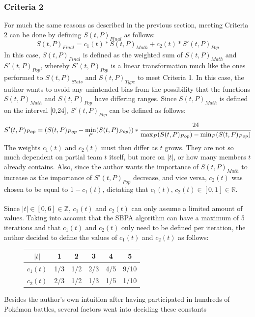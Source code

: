\documentclass{article}
\begin{document}
\subsubsection{Criteria 2}
For much the same reasons as described in the previous section, meeting Criteria 2 can be done by defining $S(t,P)_{Final}$ as follows:
\begin{equation*}
	S(t,P)_{Final}=c_1(t)*S(t,P)_{Math}+c_2(t)*S'(t,P)_{Pop}
\end{equation*}
In this case, $S(t,P)_{Final}$ is defined as the weighted sum of $S(t,P)_{Math}$ and $S'(t,P)_{Pop}$, whereby $S'(t,P)_{Pop}$ is a linear transformation much like the ones performed to $S(t,P)_{Stats}$ and $S(t,P)_{Type}$ to meet Criteria 1. In this case, the author wants to avoid any unintended bias from the possibility that the functions $S(t,P)_{Math}$ and $S(t,P)_{Pop}$ have differing ranges. Since $S(t,P)_{Math}$ is defined on the interval [0,24], $S'(t,P)_{Pop}$ can be defined as follows:
\begin{equation*}
	S'(t,P)_{Pop}=(S(t,P)_{Pop}-\min_P(S(t,P)_{Pop}))*\cfrac{24}{\max_P(S(t,P)_{Pop})-\min_P(S(t,P)_{Pop})}
\end{equation*}
The weights $c_1(t)$ and $c_2(t)$ must then differ as $t$ grows. They are not so much dependent on partial team $t$ itself, but more on $|t|$, or how many members $t$ already contains. Also, since the author wants the importance of $S(t,P)_{Math}$ to increase as the importance of $S'(t,P)_{Pop}$ decrease, and vice versa, $c_2(t)$ was chosen to be equal to $1-c_1(t)$, dictating that $c_1(t)\text{, }c_2(t)\in[0,1]\in\mathbb{R}$.\\\\
Since $|t|\in [0,6]\in\mathbb{Z}$, $c_1(t)$ and $c_2(t)$ can only assume a limited amount of values. Taking into account that the SBPA algorithm can have a maximum of 5 iterations and that $c_1(t)$ and $c_2(t)$ only need to be defined per iteration, the author decided to define the values of $c_1(t)$ and $c_2(t)$ as follows:
\begin{figure}[H]
	\begin{tabular}{c||c|c|c|c|c}
		$|t|$&1&2&3&4&5\\
		\hline
		$c_1(t)$&1/3&1/2&2/3&4/5&9/10\\
		$c_2(t)$&2/3&1/2&1/3&1/5&1/10
	\end{tabular}
	\centering
\end{figure}
Besides the author's own intuition after having participated in hundreds of Pok\'emon battles, several factors went into deciding these constants
\end{document}

